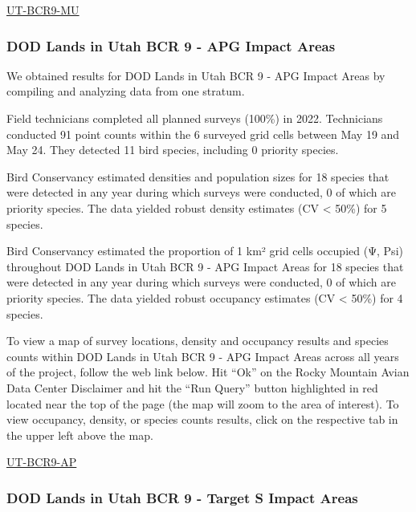 \documentclass[
  letterpaper,
  DIV=11,
  numbers=noendperiod,
  oneside]{scrreprt}
\begin{document}
\href{http://www.rmbo.org/new_site/adc/QueryWindow.aspx\#N4IgzgLgTghhCuBbEAuABCAqgFQLQCEBhAJQE5cBZTdAEQFMAHGKCROgOwjQHsAzNerw5g6aXGgrwAJrwA2cMCAC+QA=}{UT-BCR9-MU}

\hypertarget{dod-lands-in-utah-bcr-9---apg-impact-areas}{%
\subsubsection{DOD Lands in Utah BCR 9 - APG Impact
Areas}\label{dod-lands-in-utah-bcr-9---apg-impact-areas}}

We obtained results for DOD Lands in Utah BCR 9 - APG Impact Areas by
compiling and analyzing data from one stratum.

Field technicians completed all planned surveys (100\%) in 2022.
Technicians conducted 91 point counts within the 6 surveyed grid cells
between May 19 and May 24. They detected 11 bird species, including 0
priority species.

Bird Conservancy estimated densities and population sizes for 18 species
that were detected in any year during which surveys were conducted, 0 of
which are priority species. The data yielded robust density estimates
(CV \textless{} 50\%) for 5 species.

Bird Conservancy estimated the proportion of 1 km² grid cells occupied
(Ψ, Psi) throughout DOD Lands in Utah BCR 9 - APG Impact Areas for 18
species that were detected in any year during which surveys were
conducted, 0 of which are priority species. The data yielded robust
occupancy estimates (CV \textless{} 50\%) for 4 species.

To view a map of survey locations, density and occupancy results and
species counts within DOD Lands in Utah BCR 9 - APG Impact Areas across
all years of the project, follow the web link below. Hit ``Ok'' on the
Rocky Mountain Avian Data Center Disclaimer and hit the ``Run Query''
button highlighted in red located near the top of the page (the map will
zoom to the area of interest). To view occupancy, density, or species
counts results, click on the respective tab in the upper left above the
map.

\href{http://www.rmbo.org/new_site/adc/QueryWindow.aspx\#N4IgzgLgTghhCuBbEAuABCAqgFQLQCEBhAJQE5cBBABXQBEBTABxigkXoDsI0B7AMzQM+nMPTS401AOJoAkomYBjbhSj0YIAL5A=}{UT-BCR9-AP}

\hypertarget{dod-lands-in-utah-bcr-9---target-s-impact-areas}{%
\subsubsection{DOD Lands in Utah BCR 9 - Target S Impact
Areas}\label{dod-lands-in-utah-bcr-9---target-s-impact-areas}}
\end{document}
